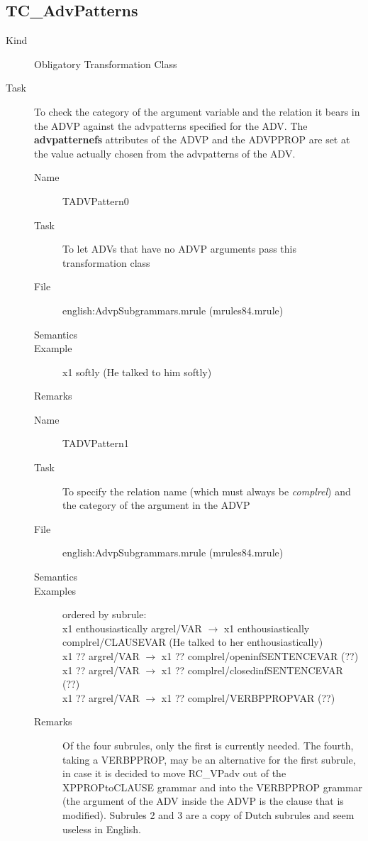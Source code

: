 \subsection{TC\_AdvPatterns}
\begin{description}
\item[Kind] Obligatory Transformation Class
\item[Task] To check the category of the argument variable and the relation 
it bears in the ADVP against the advpatterns specified for the ADV. The {\bf 
advpatternefs} attributes of the ADVP and the ADVPPROP are set at the value 
actually chosen from the advpatterns of the ADV.

\vspace{1 cm}
\begin{description}
\item[Name] TADVPattern0
\item[Task] To let ADVs that have no ADVP arguments pass this transformation 
class
\item[File] english:AdvpSubgrammars.mrule (mrules84.mrule)
\item[Semantics]
\item[Example] x1 softly (He talked to him softly)
\item[Remarks]
\end{description}

\vspace{1 cm}
\begin{description}
\item[Name] TADVPattern1
\item[Task] To specify the relation name (which must always be {\em complrel\/})
and the category of the argument in the ADVP 
\item[File] english:AdvpSubgrammars.mrule (mrules84.mrule)
\item[Semantics]
\item[Examples] ordered by subrule: \\
x1 enthousiastically argrel/VAR $\rightarrow$ x1 enthousiastically 
complrel/CLAUSEVAR
 (He talked to her enthousiastically)\\
x1 ?? argrel/VAR $\rightarrow$ x1 ?? complrel/openinfSENTENCEVAR (??)\\
x1 ?? argrel/VAR $\rightarrow$ x1 ?? complrel/closedinfSENTENCEVAR (??)\\ 
x1 ?? argrel/VAR $\rightarrow$ x1 ?? complrel/VERBPPROPVAR  (??)
\item[Remarks] Of the four subrules, only the first is currently needed. The 
fourth, taking a VERBPPROP, may be an alternative for the first subrule, in 
case it is decided to move RC\_VPadv out of the XPPROPtoCLAUSE grammar and into 
the VERBPPROP grammar (the argument of the ADV inside the ADVP is the clause 
that is modified). Subrules 2 and 3 are a copy of Dutch subrules and seem 
useless in English.
\end{description}

\end{description}

